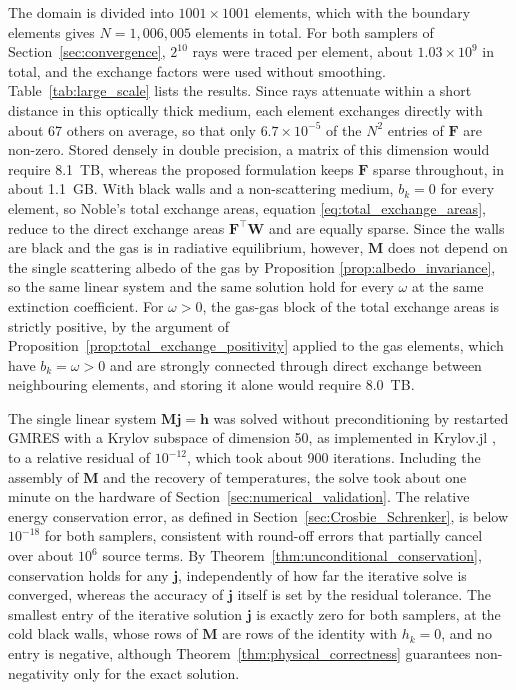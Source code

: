 \documentclass[preprint,1p,times]{elsarticle}
\theoremstyle{plain}
\theoremstyle{definition}
\theoremstyle{remark}
\begin{document}
The domain is divided into $1001 \times 1001$ elements, which with the boundary elements gives $N = 1{,}006{,}005$ elements in total. For both samplers of Section~\ref{sec:convergence}, $2^{10}$ rays were traced per element, about $1.03\times 10^9$ in total, and the exchange factors were used without smoothing. Table~\ref{tab:large_scale} lists the results. Since rays attenuate within a short distance in this optically thick medium, each element exchanges directly with about 67 others on average, so that only $6.7\times 10^{-5}$ of the $N^2$ entries of $\mathbf{F}$ are non-zero. Stored densely in double precision, a matrix of this dimension would require 8.1~TB, whereas the proposed formulation keeps $\mathbf{F}$ sparse throughout, in about 1.1~GB. With black walls and a non-scattering medium, $b_k = 0$ for every element, so Noble's total exchange areas, equation \eqref{eq:total_exchange_areas}, reduce to the direct exchange areas $\mathbf{F}^\top\mathbf{W}$ and are equally sparse. Since the walls are black and the gas is in radiative equilibrium, however, $\mathbf{M}$ does not depend on the single scattering albedo of the gas by Proposition \ref{prop:albedo_invariance}, so the same linear system and the same solution hold for every $\omega$ at the same extinction coefficient. For $\omega>0$, the gas-gas block of the total exchange areas is strictly positive, by the argument of Proposition~\ref{prop:total_exchange_positivity} applied to the gas elements, which have $b_k = \omega > 0$ and are strongly connected through direct exchange between neighbouring elements, and storing it alone would require 8.0~TB.

The single linear system $\mathbf{M}\mathbf{j} = \mathbf{h}$ was solved without preconditioning by restarted GMRES with a Krylov subspace of dimension 50, as implemented in Krylov.jl \citep{Montoison2023}, to a relative residual of $10^{-12}$, which took about 900 iterations. Including the assembly of $\mathbf{M}$ and the recovery of temperatures, the solve took about one minute on the hardware of Section~\ref{sec:numerical_validation}. The relative energy conservation error, as defined in Section~\ref{sec:Crosbie_Schrenker}, is below $10^{-18}$ for both samplers, consistent with round-off errors that partially cancel over about $10^6$ source terms. By Theorem~\ref{thm:unconditional_conservation}, conservation holds for any $\mathbf{j}$, independently of how far the iterative solve is converged, whereas the accuracy of $\mathbf{j}$ itself is set by the residual tolerance. The smallest entry of the iterative solution $\mathbf{j}$ is exactly zero for both samplers, at the cold black walls, whose rows of $\mathbf{M}$ are rows of the identity with $h_k = 0$, and no entry is negative, although Theorem~\ref{thm:physical_correctness} guarantees non-negativity only for the exact solution.
\end{document}

